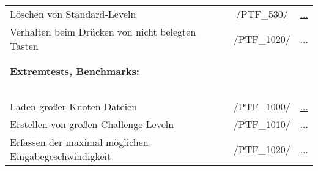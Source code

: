 \begin{longtable}{p{0.5\hsize}p{0.275\hsize}p{0.275\hsize}}
	\\
	
	  \multicolumn{1}{L{6.5cm}}{Löschen von Standard-Leveln}
	& \multicolumn{1}{c}{/PTF\_530/}
	& \multicolumn{1}{c}{\hyperref[]{...}}
	
	\\
	
	  \multicolumn{1}{L{6.5cm}}{Verhalten beim Drücken von nicht belegten Tasten}
	& \multicolumn{1}{c}{/PTF\_1020/}
	& \multicolumn{1}{c}{\hyperref[]{...}}
	
	\\
	\\
	\\
	
	
	

	  \multicolumn{3}{l}{\textbf{Extremtests, Benchmarks:}}
	  
	\\
	
	  \multicolumn{3}{l}{~}
	  
	\\
	
	  \multicolumn{1}{L{6.5cm}}{Laden großer Knoten-Dateien}
	& \multicolumn{1}{c}{/PTF\_1000/}
	& \multicolumn{1}{c}{\hyperref[]{...}}
	
	\\
	
	  \multicolumn{1}{L{6.5cm}}{Erstellen von großen Challenge-Leveln}
	& \multicolumn{1}{c}{/PTF\_1010/}
	& \multicolumn{1}{c}{\hyperref[]{...}}
	
	\\
	
	  \multicolumn{1}{L{6.5cm}}{Erfassen der maximal möglichen Eingabegeschwindigkeit}
	& \multicolumn{1}{c}{/PTF\_1020/}
	& \multicolumn{1}{c}{\hyperref[]{...}}
	
	\\
	
\end{longtable}


